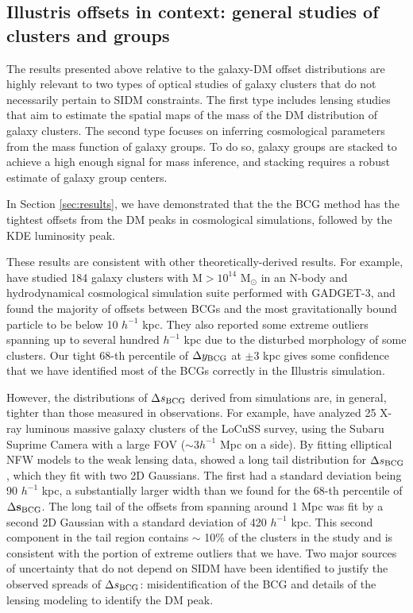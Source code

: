 \documentclass[usenatbib]{mn2e}
\newcommand{\offset}{\Delta {\bf s}}
\begin{document}
{\subsection{Illustris offsets in context: general studies of clusters and groups}
\label{subsec:non_SIDM_offsets}

The results presented above relative to the galaxy-DM offset distributions are highly relevant to two types of optical studies of galaxy clusters that do not necessarily pertain to SIDM constraints.
The first type includes lensing studies that aim to estimate the spatial maps of 
the mass of the DM distribution of galaxy clusters. 
The second type focuses on inferring cosmological parameters from the 
mass function of galaxy groups. To do so, galaxy groups are stacked to achieve a high enough signal for mass inference, and stacking requires a robust estimate of galaxy group centers. 

In Section \ref{sec:results}, we have demonstrated that the the BCG method has the tightest offsets from the DM peaks in cosmological simulations, followed by the KDE luminosity peak. 

These results are consistent with other theoretically-derived results. For example, \cite{Cui2015} have studied 184 galaxy clusters with M$ > 10^{14}$ M$_\odot$ in an
N-body and hydrodynamical cosmological simulation suite performed with {\sc GADGET-3}, and found the majority of offsets between BCGs and the most gravitationally bound particle to be below 10 $h^{-1}$ kpc. They also reported some extreme outliers 
spanning up to several hundred $h^{-1}$ kpc due to the disturbed morphology of
some clusters. Our tight 68-th percentile of 
$\Delta y_{\rm BCG}$ at $ \pm 3$ kpc gives some confidence that 
we have identified most of the BCGs correctly in the Illustris simulation.

However, the distributions of $\Delta s_{\rm BCG}$ derived from simulations are, in general, tighter than those measured in observations.
For example, \cite{Oguri2010} have analyzed 25 X-ray luminous 
massive galaxy clusters of the LoCuSS survey, using the Subaru Suprime Camera with a large FOV ($\sim 3 h^{-1}$ Mpc on a side).
By fitting elliptical NFW models to the weak lensing data, \cite{Oguri2010}
showed a long tail distribution for $\Delta s_{\rm BCG}$, which they fit with two 2D Gaussians.
The first had a standard deviation being 90
$h^{-1}$ kpc, a substantially larger width than we found for the
68-th percentile of $\offset_{\rm BCG}$. 
The long tail of the offsets from \cite{Oguri2010} spanning around 1 Mpc was fit by a second 2D
Gaussian with a standard deviation of 420 $h^{-1}$ kpc. This second component
in the tail region contains $\sim$ 10\% of the clusters in the study and is
consistent with the portion of extreme outliers that we have.   
Two major sources of uncertainty that do not depend on SIDM have been identified to justify the observed spreads of $\Delta s_{\rm BCG}$: misidentification of the BCG and details of the lensing modeling to identify the DM peak. 

}
\end{document}
